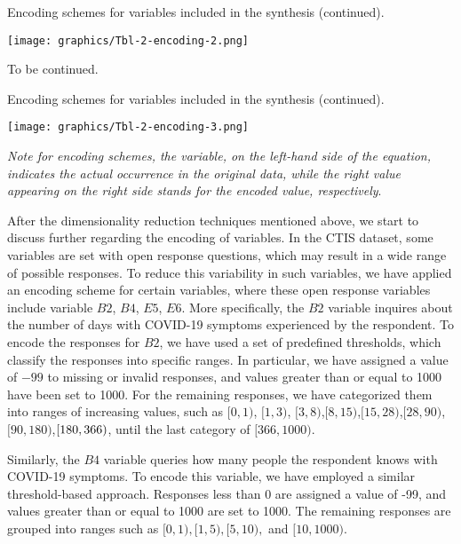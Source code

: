 \begin{table}[H]
\ContinuedFloat
\centering
  \caption{Encoding schemes for variables included in the synthesis (continued).}
  \texttt{[image: graphics/Tbl-2-encoding-2.png]}
  {\raggedleft To be continued.\par}
\end{table}

\begin{table}[H]
\ContinuedFloat
\centering
  \caption{Encoding schemes for variables included in the synthesis (continued).}
  \texttt{[image: graphics/Tbl-2-encoding-3.png]}
  {\raggedright \textit{Note for encoding schemes, the variable, on the left-hand side of the equation, indicates the actual occurrence in the original data, while the right value appearing on the right side stands for the encoded value, respectively}.\par}
\end{table}


After the dimensionality reduction techniques mentioned above, we start to discuss further regarding the encoding of variables. In the CTIS dataset, some variables are set with open response 
questions, which may result in a wide range of possible responses. To reduce this variability in such variables, we have applied an encoding scheme for certain variables, where these open response 
variables include variable $B2$, $B4$, $E5$, $E6$. More specifically, the $B2$ variable inquires about the number of days with COVID-19 symptoms experienced by the respondent. To encode the responses for $B2$, we have used a set of predefined thresholds, which classify the responses into specific ranges. In particular, we have assigned a value of $-99$ to missing or invalid responses, and values greater than or equal to 1000 have been set to 1000. For the remaining responses, we have categorized them into ranges of increasing values, such as $[0,1)$, $[1,3)$, $[3,8)$,$[8,15)$,$[15, 28)$,$[28, 90)$,$[90, 180)$,$[180, \\366)$, until the last category of $[366,1000)$.

Similarly, the $B4$ variable queries how many people the respondent knows with COVID-19 symptoms. To encode this variable, we have employed a similar threshold-based approach. 
Responses less than 0 are assigned a value of -99, and values greater than or equal to 1000 are set to 1000. The remaining responses are grouped into ranges such as $[0,1), [1,5), [5,10),$ and 
$[10,1000)$.

